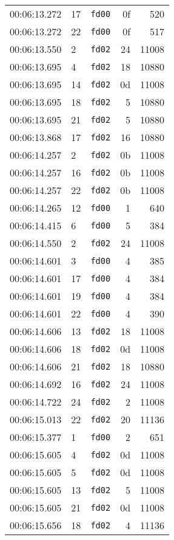 \documentclass{article}
\begin{document}
\begin{longtable}{lllrr}
00:06:13.272 & 17 & \texttt{fd00} & 0f & 520 \\
00:06:13.272 & 22 & \texttt{fd00} & 0f & 517 \\
00:06:13.550 & 2 & \texttt{fd02} & 24 & 11008 \\
00:06:13.695 & 4 & \texttt{fd02} & 18 & 10880 \\
00:06:13.695 & 14 & \texttt{fd02} & 0d & 11008 \\
00:06:13.695 & 18 & \texttt{fd02} & 5 & 10880 \\
00:06:13.695 & 21 & \texttt{fd02} & 5 & 10880 \\
00:06:13.868 & 17 & \texttt{fd02} & 16 & 10880 \\
00:06:14.257 & 2 & \texttt{fd02} & 0b & 11008 \\
00:06:14.257 & 16 & \texttt{fd02} & 0b & 11008 \\
00:06:14.257 & 22 & \texttt{fd02} & 0b & 11008 \\
00:06:14.265 & 12 & \texttt{fd00} & 1 & 640 \\
00:06:14.415 & 6 & \texttt{fd00} & 5 & 384 \\
00:06:14.550 & 2 & \texttt{fd02} & 24 & 11008 \\
00:06:14.601 & 3 & \texttt{fd00} & 4 & 385 \\
00:06:14.601 & 17 & \texttt{fd00} & 4 & 384 \\
00:06:14.601 & 19 & \texttt{fd00} & 4 & 384 \\
00:06:14.601 & 22 & \texttt{fd00} & 4 & 390 \\
00:06:14.606 & 13 & \texttt{fd02} & 18 & 11008 \\
00:06:14.606 & 18 & \texttt{fd02} & 0d & 11008 \\
00:06:14.606 & 21 & \texttt{fd02} & 18 & 10880 \\
00:06:14.692 & 16 & \texttt{fd02} & 24 & 11008 \\
00:06:14.722 & 24 & \texttt{fd02} & 2 & 11008 \\
00:06:15.013 & 22 & \texttt{fd02} & 20 & 11136 \\
00:06:15.377 & 1 & \texttt{fd00} & 2 & 651 \\
00:06:15.605 & 4 & \texttt{fd02} & 0d & 11008 \\
00:06:15.605 & 5 & \texttt{fd02} & 0d & 11008 \\
00:06:15.605 & 13 & \texttt{fd02} & 5 & 11008 \\
00:06:15.605 & 21 & \texttt{fd02} & 0d & 11008 \\
00:06:15.656 & 18 & \texttt{fd02} & 4 & 11136 \\

\end{longtable}
\end{document}
